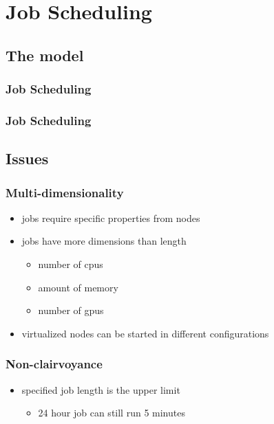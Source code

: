 \section{Job Scheduling}
\subsection{The model}

\begin{frame}
	\frametitle{Job Scheduling}
	\center
	\begin{minipage}[b]{\textwidth}
		
	\end{minipage}
\end{frame}

\begin{frame}
	\frametitle{Job Scheduling}
	\center
	\begin{minipage}[b]{\textwidth}
		
	\end{minipage}
\end{frame}

\subsection{Issues}

\begin{frame}
	\frametitle{Multi-dimensionality}
	\begin{itemize}
		\item jobs require specific properties from nodes
		\item jobs have more dimensions than length
		\begin{itemize}
			\item number of cpus
			\item amount of memory
			\item number of gpus
		\end{itemize}
		\item virtualized nodes can be started in different configurations
	\end{itemize}
\end{frame}

\begin{frame}
	\frametitle{Non-clairvoyance}
	\begin{itemize}
		\item specified job length is the upper limit
		\begin{itemize}
			\item 24 hour job can still run 5 minutes
		\end{itemize}
	\end{itemize}
\end{frame}

